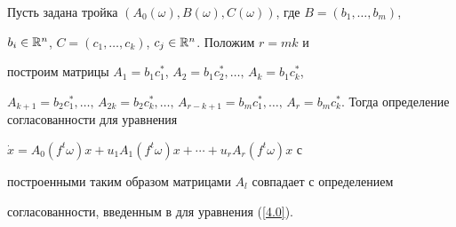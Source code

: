 




\begin{note}


\label{rem4.2}


Пусть задана тройка $(A_0(\omega),B(\omega),C(\omega))$, где $B=(b_1,\dotsc,b_m)$,


$b_i\in\Bbb R^n$, $C=(c_1,\dotsc,c_k)$, $c_j\in\Bbb R^n$. Положим $r=mk$ и


построим матрицы $A_1=b_1c_1^*$, $A_2=b_1c_2^*,\dotsc,\,A_k=b_1c_k^*$,


$A_{k+1}=b_2c_1^*,\dotsc,\,A_{2k}=b_2c_k^*,\dotsc,\,A_{r-k+1}=b_mc_1^*,


\dotsc,\,A_r=b_mc_k^*$. Тогда определение согласованности для уравнения


$\Dot x=A_0(f^t\omega)x+u_1A_1(f^t\omega)x+\dotsb+u_r A_r(f^t\omega)x$ с


построенными таким образом матрицами $A_l$ совпадает с определением


согласованности, введенным в \cite{PT94} для уравнения (\ref{4.0}).


\end{note}





